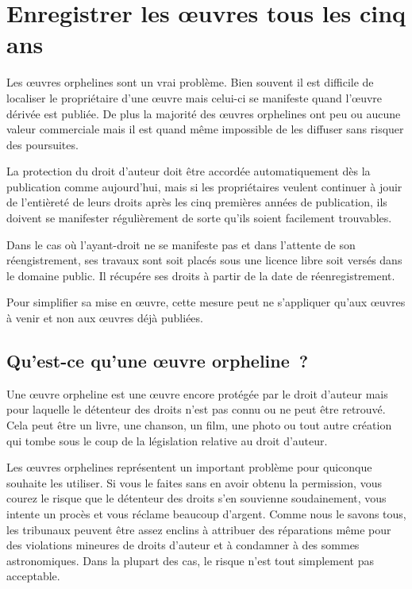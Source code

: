 \chapter{Enregistrer les œuvres tous les cinq ans}\label{registre}

Les œuvres orphelines sont un vrai problème. Bien souvent il est difficile de localiser le
propriétaire d’une œuvre mais celui-ci se manifeste quand l’œuvre dérivée est publiée. De plus la
majorité des œuvres orphelines ont peu ou aucune valeur commerciale mais il est quand même
impossible de les diffuser sans risquer des poursuites.

\begin{mesure}
 La protection du droit d’auteur doit être accordée automatiquement dès la publication comme
aujourd’hui, mais si les propriétaires veulent continuer à jouir de l'entièreté de leurs droits après les cinq
premières années de publication, ils doivent se manifester régulièrement de sorte qu’ils soient facilement
trouvables. 

Dans le cas où l'ayant-droit ne se manifeste pas et dans l'attente de son réengistrement, ses travaux sont soit placés sous une licence libre soit versés dans le domaine public. Il récupére ses droits à partir de la date de réenregistrement.

Pour simplifier sa mise en œuvre, cette mesure peut ne s'appliquer qu'aux œuvres à venir et non aux œuvres déjà publiées.
\end{mesure}

\section{Qu'est-ce qu'une œuvre orpheline~?}

Une œuvre orpheline est une œuvre encore protégée par le droit d’auteur mais pour laquelle le
détenteur des droits n’est pas connu ou ne peut être retrouvé. Cela peut être un livre, une chanson,
un film, une photo ou tout autre création qui tombe sous le coup de la législation relative au droit
d’auteur.

Les œuvres orphelines représentent un important problème pour quiconque souhaite les utiliser. Si
vous le faites sans en avoir obtenu la permission, vous courez le risque que le détenteur des droits
s’en souvienne soudainement, vous intente un procès et vous réclame beaucoup d’argent. Comme nous le
savons tous, les tribunaux peuvent être assez enclins à attribuer des réparations même pour des
violations mineures de droits d’auteur et à condamner à des sommes astronomiques. Dans la plupart
des cas, le risque n’est tout simplement pas acceptable.

